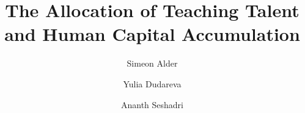 \documentclass[11pt]{beamer}
\title{The Allocation of Teaching Talent and Human Capital Accumulation}
\author[shortname]{Simeon Alder\inst{1} \and Yulia Dudareva\inst{1} \and Ananth Seshadri\inst{1}}
\institute[shortinst]{\inst{1} University of Wisconsin--Madison}
\date{}
\begin{document}
\begin{frame}
\titlepage
\end{frame}

%
%
%
%
%
\end{document}
